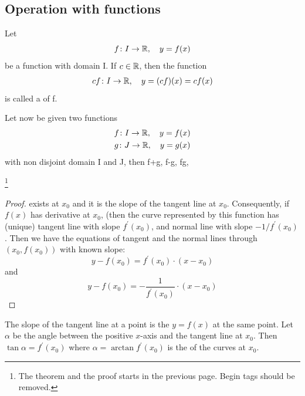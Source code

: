 \documentclass[11pt]{amsbook}
\begin{document}
\subsection{Operation with functions}
Let
\[
	f\colon I \to \mathbb{R},\quad y = f(x)
\]
be a function with domain I. If $c \in \mathbb{R}$, then the function
\begin{align}
	\label{eq:b1p1_053_scalarMultiple}
	cf\colon I \to \mathbb{R},\quad y = (cf)(x) = cf(x)
\end{align}
is called a  of f.

Let now be given two functions
\begin{gather*}
	f\colon I \to \mathbb{R},\quad y= f(x) \\
	g\colon J \to \mathbb{R},\quad y= g(x)
\end{gather*}
with non disjoint domain I and J, then f+g, f-g, fg,





\begin{thm} \footnote{The theorem and the proof starts in the previous page. 
                                      Begin tags should be removed.}

	\begin{proof}
		exists at $ x_0$ and it is the slope of the 
		tangent line at $x_0$. Consequently, if $f(x)$ has derivative at $x_0$, 
		(then the curve represented by this function has (unique) tangent line with slope $f^\prime(x_0)$, 
                     and normal line with slope $-1/f^\prime(x_0)$. 
		Then we have the equations of tangent and the normal lines through $(x_0,f(x_0))$ with known slope:
		\[
			y - f(x_0) = 
					f^\prime(x_0) 
						\cdot 
							(x-x_0)
		\]
		and
		\[
			y - f(x_0) = 
					- \frac
						{1}
						{f^\prime(x_0)} 
							\cdot 
								(x-x_0)
		\]
	\end{proof}

\end{thm}


The slope of the tangent line at a point is the 
$y = f(x)$ at the same point. Let $\alpha$ be the angle between the positive $x$-axis and the tangent line at $x_0$. 
Then $\tan \alpha = f^\prime(x_0)$ where $\alpha = \arctan f^\prime(x_0)$ is the 
of the curves at $x_0$.\\
\end{document}
